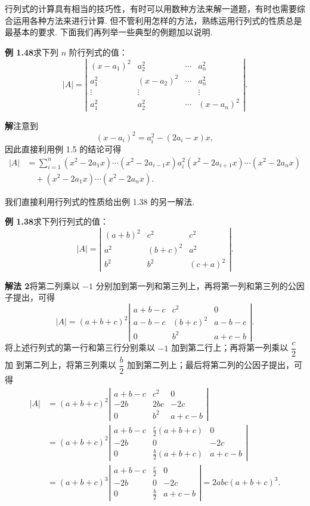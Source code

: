 \documentclass[UTF8, 12pt, fontset=fandol, oneside]{ctexart}
\begin{document}
行列式的计算具有相当的技巧性，有时可以用数种方法来解一道题，有时也需要综合运用各种方法来进行计算. 但不管利用怎样的方法，熟练运用行列式的性质总是最基本的要求. 下面我们再列举一些典型的例题加以说明.

\noindent\textbf{例 1.48}\quad 求下列 $n$ 阶行列式的值：
\[
|A|=\left|\begin{array}{cccc}
(x-a_1)^2 & a_2^2 & \cdots & a_n^2\\
a_1^2 & (x-a_2)^2 & \cdots & a_n^2\\
\vdots & \vdots &        & \vdots\\
a_1^2 & a_2^2 & \cdots & (x-a_n)^2
\end{array}\right|.
\]

\noindent\textbf{解}\quad 注意到
\[
(x-a_i)^2=a_i^2-(2a_i-x)x,
\]
因此直接利用例 1.5 的结论可得
\[
\begin{aligned}
|A|
&=\sum_{i=1}^n(x^2-2a_1x)\cdots(x^2-2a_{i-1}x)a_i^2
(x^2-2a_{i+1}x)\cdots(x^2-2a_nx)\\
&\quad+(x^2-2a_1x)\cdots(x^2-2a_nx).
\end{aligned}
\]

我们直接利用行列式的性质给出例 1.38 的另一解法.

\noindent\textbf{例 1.38}\quad 求下列行列式的值：
\[
|A|=\left|\begin{array}{ccc}
(a+b)^2 & c^2 & c^2\\
a^2 & (b+c)^2 & a^2\\
b^2 & b^2 & (c+a)^2
\end{array}\right|.
\]

\noindent\textbf{解法 2}\quad 将第二列乘以 $-1$ 分别加到第一列和第三列上，再将第一列和第三列的公因子提出，可得
\[
|A|=(a+b+c)^2
\left|\begin{array}{ccc}
a+b-c & c^2 & 0\\
a-b-c & (b+c)^2 & a-b-c\\
0 & b^2 & a+c-b
\end{array}\right|.
\]
将上述行列式的第一行和第三行分别乘以 $-1$ 加到第二行上；再将第一列乘以 $\dfrac c2$ 加
到第二列上，将第三列乘以 $\dfrac b2$ 加到第二列上；最后将第二列的公因子提出，可得
\[
\begin{aligned}
|A|
&=(a+b+c)^2
\left|\begin{array}{ccc}
a+b-c & c^2 & 0\\
-2b & 2bc & -2c\\
0 & b^2 & a+c-b
\end{array}\right|\\
&=(a+b+c)^2
\left|\begin{array}{ccc}
a+b-c & \frac c2(a+b+c) & 0\\
-2b & 0 & -2c\\
0 & \frac b2(a+b+c) & a+c-b
\end{array}\right|\\
&=(a+b+c)^3
\left|\begin{array}{ccc}
a+b-c & \frac c2 & 0\\
-2b & 0 & -2c\\
0 & \frac b2 & a+c-b
\end{array}\right|
=2abc(a+b+c)^3.
\end{aligned}
\]
\end{document}
